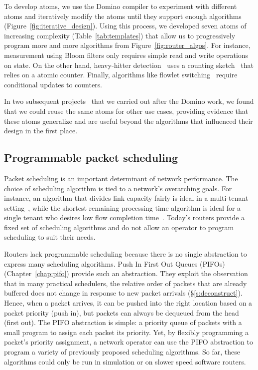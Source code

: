 To develop atoms, we use the Domino compiler to experiment with different atoms
and iteratively modify the atoms until they support enough algorithms
(Figure~\ref{fig:iterative_design}).  Using this process, we developed seven
atoms of increasing complexity (Table~\ref{tab:templates}) that allow us to
progressively program more and more algorithms from
Figure~\ref{fig:router_algos}. For instance, measurement using Bloom filters
only requires simple read and write operations on state. On the other hand,
heavy-hitter detection~\cite{opensketch} uses a counting
sketch~\cite{count_min} that relies on a atomic counter. Finally, algorithms
like flowlet switching~\cite{flare} require conditional updates to counters.

In two subsequent projects~\cite{hula, perf_query} that we carried out after
the Domino work, we found that we could reuse the same atoms for other use
cases, providing evidence that these atoms generalize and are useful beyond the
algorithms that influenced their design in the first place.

\subsection{Programmable packet scheduling}
Packet scheduling is an important determinant of network performance. The
choice of scheduling algorithm is tied to a network's overarching goals. For
instance, an algorithm that divides link capacity fairly is ideal in a
multi-tenant setting~\cite{wfq}, while the shortest remaining processing time
algorithm is ideal for a single tenant who desires low flow completion
time~\cite{pFabric}. Today's routers provide a fixed set of scheduling
algorithms and do not allow an operator to program scheduling to suit their
needs.

Routers lack programmable scheduling because there is no single abstraction to
express many scheduling algorithms. Push In First Out Queues (PIFOs) (Chapter~\ref{chap:pifo})
 provide
such an abstraction. They exploit the observation that in many practical schedulers,
the relative order of packets that are already buffered does not change in
response to new packet arrivals (\S\ref{s:deconstruct}). Hence, when a packet arrives, it can
be pushed into the right location based on a packet priority (push in), but
packets can always be dequeued from the head (first out). The PIFO abstraction
is simple: a priority queue of packets with a small program to assign each
packet its priority. Yet, by flexibly programming a packet's priority
assignment, a network operator can use the PIFO abstraction to program a
variety of previously proposed scheduling algorithms. So far, these algorithms
could only be run in simulation or on slower speed software routers.

